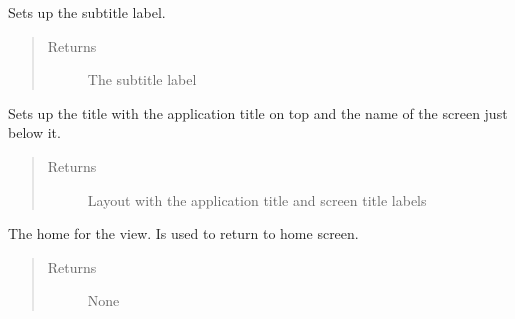 \documentclass[letterpaper,10pt,english]{sphinxmanual}
\begin{document}
\begin{fulllineitems}
\begin{fulllineitems}
\begin{quote}
\begin{description}
\end{description}\end{quote}

\end{fulllineitems}


\begin{fulllineitems}
\label{\detokenize{index:src.Views.View_LoadingScreen.LoadingWindow.setSubtitle}}
Sets up the subtitle label.
\begin{quote}\begin{description}
\item[{Returns}] \leavevmode
The subtitle label

\end{description}\end{quote}

\end{fulllineitems}


\begin{fulllineitems}
\label{\detokenize{index:src.Views.View_LoadingScreen.LoadingWindow.setTitle}}
Sets up the title with the application title on top and the name of the screen just below it.
\begin{quote}\begin{description}
\item[{Returns}] \leavevmode
Layout with the application title and screen title labels

\end{description}\end{quote}

\end{fulllineitems}


\begin{fulllineitems}
\label{\detokenize{index:src.Views.View_LoadingScreen.LoadingWindow.set_BtnHome}}
The home for the view. Is used to return to home screen.
\begin{quote}\begin{description}
\item[{Returns}] \leavevmode
None


\end{description}
\end{quote}
\end{fulllineitems}
\end{fulllineitems}
\end{document}
